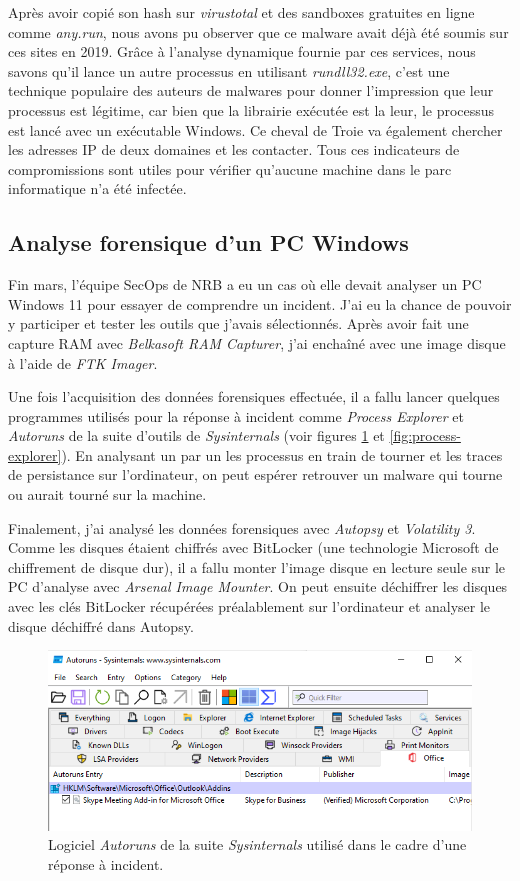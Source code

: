Après avoir copié son hash sur \textit{virustotal} et des sandboxes gratuites en ligne comme \textit{any.run}, nous avons pu observer que ce malware avait déjà été soumis sur ces sites en 2019. Grâce à l'analyse dynamique fournie par ces services, nous savons qu'il lance un autre processus en utilisant \textit{rundll32.exe}, c'est une technique populaire des auteurs de malwares pour donner l'impression que leur processus est légitime, car bien que la librairie exécutée est la leur, le processus est lancé avec un exécutable Windows. Ce cheval de Troie va également chercher les adresses IP de deux domaines et les contacter. Tous ces indicateurs de compromissions sont utiles pour vérifier qu'aucune machine dans le parc informatique n'a été infectée.



\subsection{Analyse forensique d'un PC Windows}

Fin mars, l'équipe SecOps de NRB a eu un cas où elle devait analyser un PC Windows 11 pour essayer de comprendre un incident. J'ai eu la chance de pouvoir y participer et tester les outils que j'avais sélectionnés. Après avoir fait une capture RAM avec \textit{Belkasoft RAM Capturer}, j'ai enchaîné avec une image disque à l'aide de \textit{FTK Imager}.

Une fois l'acquisition des données forensiques effectuée, il a fallu lancer quelques programmes utilisés pour la réponse à incident comme \textit{Process Explorer} et \textit{Autoruns} de la suite d'outils de \textit{Sysinternals} (voir figures \ref{fig:autoruns} et \ref{fig:process-explorer}). En analysant un par un les processus en train de tourner et les traces de persistance sur l'ordinateur, on peut espérer retrouver un malware qui tourne ou aurait tourné sur la machine.

Finalement, j'ai analysé les données forensiques avec \textit{Autopsy} et \textit{Volatility 3}. Comme les disques étaient chiffrés avec BitLocker (une technologie Microsoft de chiffrement de disque dur), il a fallu monter l'image disque en lecture seule sur le PC d'analyse avec \textit{Arsenal Image Mounter}. On peut ensuite déchiffrer les disques avec les clés BitLocker récupérées préalablement sur l'ordinateur et analyser le disque déchiffré dans Autopsy.

\begin{figure}
    \centering
    \includegraphics[width=0.75\linewidth]{images/incident-response/IR-autoruns.png}
    \caption{Logiciel \textit{Autoruns} de la suite \textit{Sysinternals} utilisé dans le cadre d'une réponse à incident.}
    \label{fig:autoruns}
\end{figure}

